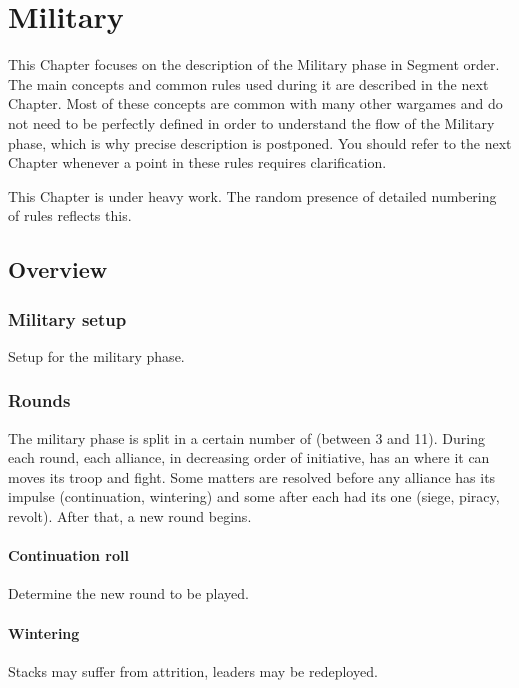 
\chapter{Military}\label{chapter:MilitaryRules}

\begin{designnote}
  This Chapter focuses on the description of the Military phase in Segment
  order. The main concepts and common rules used during it are described in
  the next Chapter. Most of these concepts are common with many other wargames
  and do not need to be perfectly defined in order to understand the flow of
  the Military phase, which is why precise description is postponed. You
  should refer to the next Chapter whenever a point in these rules requires
  clarification.
\end{designnote}

\begin{todo}
  This Chapter is under heavy work. The random presence of detailed numbering
  of rules reflects this.
\end{todo}

\section{Overview}
\aparag[Sequence]
\MilitaryDetails

\subsection{Military setup}
Setup for the military phase.

\subsection{Rounds}
The military phase is split in a certain number of  (between 3
and 11). During each round, each alliance, in decreasing order of initiative,
has an  where it can moves its troop and fight. Some matters
are resolved before any alliance has its impulse (continuation, wintering) and
some after each had its one (siege, piracy, revolt). After that, a new round
begins.
\subsubsection{Continuation roll}
Determine the new round to be played.

\subsubsection{Wintering}
Stacks may suffer from attrition, leaders may be redeployed.

